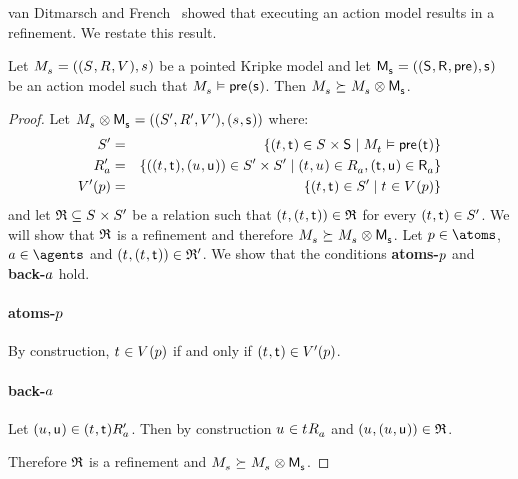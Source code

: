 van Ditmarsch and French~\cite{vanditmarsch:2009} showed that executing an action model results in a refinement.
We restate this result.

\begin{proposition}\label{action-models-refinements}
Let $\kPModelAndTuple{\kStateS}$ be a pointed Kripke model and let $\aPModelAndTuple{\aStateS}$ be an action model such that $\kPModel{\kStateS} \entails \aPrecondition(\aStateS)$.
Then $\kPModel{\kStateS} \simulates \kPModel{\kStateS} \exec \aPModel{\aStateS}$.
\end{proposition}

\begin{proof}
Let $\kPModel{\kStateS} \exec \aPModel{\aStateS} = \kPModelTupleP{(\kStateS, \aStateS)}$ where:
\begin{eqnarray*}
    \kStatesP &=& \{(\kStateT, \aStateT) \in \kStates \times \aStates \mid \kPModel{\kStateT} \entails \aPrecondition(\aStateT)\}\\
    \kAccessibilityPA &=& \{((\kStateT, \aStateT), (\kStateU, \aStateU)) \in \kStatesP \times \kStatesP \mid (\kStateT, \kStateU) \in \kAccessibilityA, (\aStateT, \aStateU) \in \aAccessibilityA\}\\
    \kValuationP(\atomP) &=& \{(\kStateT, \aStateT) \in \kStatesP \mid \kStateT \in \kValuation(\atomP)\}
\end{eqnarray*}
and let $\refinement \subseteq \kStates \times \kStatesP$ be a relation such that $(\kStateT, (\kStateT, \aStateT)) \in \refinement$ for every $(\kStateT, \aStateT) \in \kStatesP$.
We will show that $\mathfrak{R}$ is a refinement and therefore $\kPModel{\kStateS} \simulates \kPModel{\kStateS} \exec \aPModel{\aStateS}$.
Let $\atomP \in \atoms$, $\agentA \in \agents$ and $(\kStateT, (\kStateT, \aStateT)) \in \refinement'$.
We show that the conditions {\bf atoms-$p$} and {\bf back-$a$} hold.

\paragraph{atoms-$p$}
By construction, $\kStateT \in \kValuation(\atomP)$ if and only if $(\kStateT, \aStateT) \in \kValuationP(\atomP)$.

\paragraph{back-$a$}
Let $(\kStateU, \aStateU) \in \kSuccessorsPA{(\kStateT, \aStateT)}$.
Then by construction $\kStateU \in \kSuccessorsA{\kStateT}$ and $(\kStateU, (\kStateU, \aStateU)) \in \refinement $.

Therefore $\mathfrak{R}$ is a refinement and $\kPModel{\kStateS} \simulates \kPModel{\kStateS} \exec \aPModel{\aStateS}$.
\end{proof}

